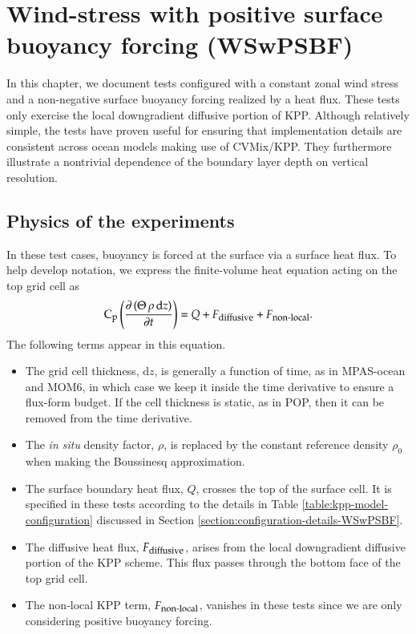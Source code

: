 \chapter{Wind-stress with positive surface buoyancy forcing
   (WSwPSBF)}
\label{chapter:WSwPSBF}

In this chapter, we document tests configured with a constant zonal
wind stress and a non-negative surface buoyancy forcing realized by a
heat flux.  These tests only exercise the local downgradient diffusive
portion of KPP.  Although relatively simple, the tests have proven
useful for ensuring that implementation details are consistent across
ocean models making use of CVMix/KPP.  They furthermore illustrate a
nontrivial dependence of the boundary layer depth on vertical
resolution.

\minitoc

\section{Physics of the experiments}

In these test cases, buoyancy is forced at the surface via a surface
heat flux.  To help develop notation, we express the finite-volume
heat equation acting on the top grid cell as
\begin{equation}
  \mbox{C}_{\mbox{\footnotesize p}} \left(   \frac{\partial  \, (\Theta \, \rho \, \mathrm{d}z )}{\partial t}  \right) =  
  Q + F_{\mbox{\footnotesize diffusive}} + F_{\mbox{\footnotesize non-local}}.
\label{eq:surface-heat-equation}
\end{equation}
The following terms appear in this equation.
\begin{itemize}
\item The grid cell thickness, $\mathrm{d}z$, is generally a function
  of time, as in MPAS-ocean and MOM6, in which case we keep it inside
  the time derivative to ensure a flux-form budget.  If the cell
  thickness is static, as in POP, then it can be removed from the time
  derivative.

\item The {\it in situ} density factor, $\rho$, is replaced by the
  constant reference density $\rho_{0}$ when making the Boussinesq
  approximation.

\item The surface boundary heat flux, $Q$, crosses the top of the
  surface cell.  It is specified in these tests according to the
  details in Table \ref{table:kpp-model-configuration} discussed in
  Section \ref{section:configuration-details-WSwPSBF}.

\item The diffusive heat flux, $F_{\mbox{\footnotesize diffusive}}$,
  arises from the local downgradient diffusive portion of the KPP
  scheme.  This flux passes through the bottom face of the top grid
  cell.

\item The non-local KPP term, $F_{\mbox{\footnotesize non-local}}$,
  vanishes in these tests since we are only considering positive
  buoyancy forcing.

\end{itemize}


